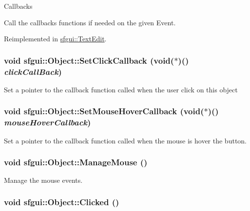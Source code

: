 Callbacks 

Call the callbacks functions if needed on the given Event. 

Reimplemented in \hyperlink{classsfgui_1_1TextEdit_af6d4be3633d3eb8bcc7a1007e324da8}{sfgui::TextEdit}.\hypertarget{classsfgui_1_1Object_d3d20a4cccde599748db724236ca0826}{
\subsubsection[SetClickCallback]{\setlength{\rightskip}{0pt plus 5cm}void sfgui::Object::SetClickCallback (void($\ast$)() {\em clickCallBack})}}
\label{classsfgui_1_1Object_d3d20a4cccde599748db724236ca0826}




Set a pointer to the callback function called when the user click on this object \hypertarget{classsfgui_1_1Object_8317dbdf44797dd69de490d4b946ed83}{
\subsubsection[SetMouseHoverCallback]{\setlength{\rightskip}{0pt plus 5cm}void sfgui::Object::SetMouseHoverCallback (void($\ast$)() {\em mouseHoverCallback})}}
\label{classsfgui_1_1Object_8317dbdf44797dd69de490d4b946ed83}




Set a pointer to the callback function called when the mouse is hover the button. \hypertarget{classsfgui_1_1Object_3332575d988f9eee589f57b2ad516593}{
\subsubsection[ManageMouse]{\setlength{\rightskip}{0pt plus 5cm}void sfgui::Object::ManageMouse ()}}
\label{classsfgui_1_1Object_3332575d988f9eee589f57b2ad516593}




Manage the mouse events. \hypertarget{classsfgui_1_1Object_da7f84701d318ce93fe59cc2f571eaf2}{
\subsubsection[Clicked]{\setlength{\rightskip}{0pt plus 5cm}void sfgui::Object::Clicked ()}}
\label{classsfgui_1_1Object_da7f84701d318ce93fe59cc2f571eaf2}




